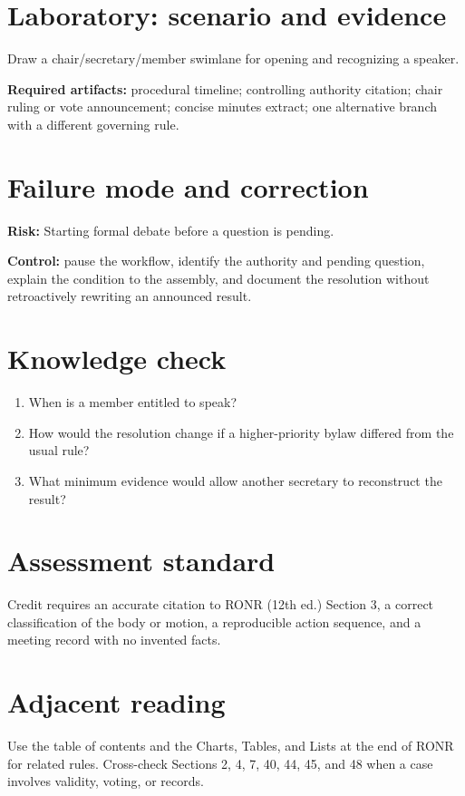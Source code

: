 \documentclass[11pt]{article}
\begin{document}
\section{Laboratory: scenario and evidence}
Draw a chair/secretary/member swimlane for opening and recognizing a speaker.

\textbf{Required artifacts:} procedural timeline; controlling authority citation; chair ruling or vote announcement; concise minutes extract; one alternative branch with a different governing rule.

\section{Failure mode and correction}
\textbf{Risk:} Starting formal debate before a question is pending.

\textbf{Control:} pause the workflow, identify the authority and pending question, explain the condition to the assembly, and document the resolution without retroactively rewriting an announced result.

\section{Knowledge check}
\begin{enumerate}[leftmargin=*,itemsep=4pt]
\item When is a member entitled to speak?
\item How would the resolution change if a higher-priority bylaw differed from the usual rule?
\item What minimum evidence would allow another secretary to reconstruct the result?
\end{enumerate}

\section{Assessment standard}
Credit requires an accurate citation to RONR (12th ed.) Section 3, a correct classification of the body or motion, a reproducible action sequence, and a meeting record with no invented facts.

\section{Adjacent reading}
Use the table of contents and the Charts, Tables, and Lists at the end of RONR for related rules. Cross-check Sections 2, 4, 7, 40, 44, 45, and 48 when a case involves validity, voting, or records.
\end{document}
